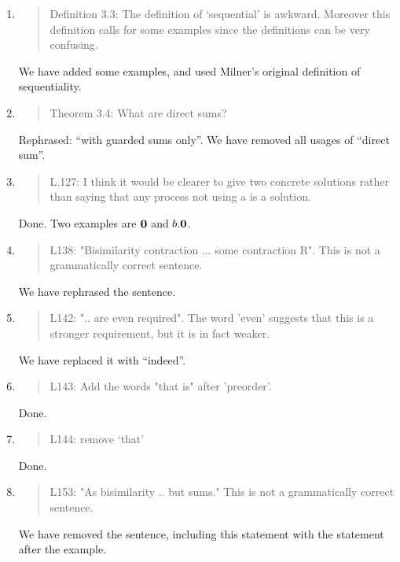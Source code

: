 \begin{enumerate}
\item \begin{quote}
Definition 3.3: The definition of ‘sequential’ is awkward.  Moreover
this definition calls for some examples since the definitions can be
very confusing.
\end{quote}
We have added some examples, and used Milner's original definition of sequentiality.
 
\item \begin{quote}
Theorem 3.4: What are direct sums?
\end{quote}
Rephrased: ``with guarded sums only''. We have removed all usages of
``direct sum''.

\item \begin{quote}
    L.127: I think it would be clearer to give two concrete solutions
    rather than saying that any process not using a is a solution.
  \end{quote}
  Done. Two examples are ${\boldsymbol 0}$ and $b.{\boldsymbol 0}$.
  
\item \begin{quote}
    L138: "Bisimilarity contraction ... some contraction R". This is not a grammatically correct sentence.
  \end{quote}
  We have rephrased the sentence.
  
\item \begin{quote}
    L142: ".. are even required". The word 'even' suggests that this
    is a stronger requirement, but it is in fact weaker.
  \end{quote}
  We have replaced it with ``indeed''.
  
\item \begin{quote}
    L143: Add the words "that is" after 'preorder'.
  \end{quote}
  Done.
  
\item \begin{quote}
    L144: remove ‘that’
  \end{quote}
  Done.
  
\item \begin{quote}
    L153: "As bisimilarity .. but sums." This is not a grammatically correct sentence.
  \end{quote}

  We have removed the sentence, including this statement with the
  statement after the example.
  

\end{enumerate}
